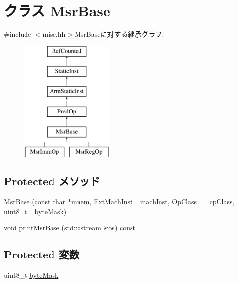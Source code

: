 \hypertarget{classMsrBase}{
\section{クラス MsrBase}
\label{classMsrBase}
}


{\ttfamily \#include $<$misc.hh$>$}MsrBaseに対する継承グラフ:\begin{figure}[H]
\begin{center}
\leavevmode
\includegraphics[height=6cm]{classMsrBase}
\end{center}
\end{figure}
\subsection*{Protected メソッド}
\begin{DoxyCompactItemize}
\item 
\hyperlink{classMsrBase_a79fafc489c6b875f952c43514d1f714b}{MsrBase} (const char $\ast$mnem, \hyperlink{classStaticInst_a5605d4fc727eae9e595325c90c0ec108}{ExtMachInst} \_\-machInst, OpClass \_\-\_\-opClass, uint8\_\-t \_\-byteMask)
\item 
void \hyperlink{classMsrBase_ad199fe95a1c0915252b3b46eaacd1515}{printMsrBase} (std::ostream \&os) const 
\end{DoxyCompactItemize}
\subsection*{Protected 変数}
\begin{DoxyCompactItemize}
\item 
uint8\_\-t \hyperlink{classMsrBase_a88c8ed0fe728ebc0bbc5182201205bfb}{byteMask}
\end{DoxyCompactItemize}


